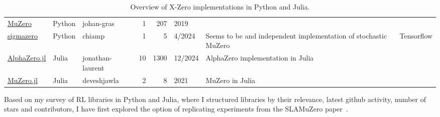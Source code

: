 \documentclass[12pt]{article}
\begin{document}
\begin{table}
\begin{adjustbox}{width=\textwidth}
\begin{tabular}{lllrrlp{6cm}l}
        \href{https://github.com/johan-gras/MuZero}{MuZero} &   Python &       johan-gras &             1 &    207 &        2019 &                                                                                                                                                                                                                                                                                             &         \\
        \href{https://github.com/chiamp/sigmazero}{sigmazero} &   Python &           chiamp &             1 &      5 &      4/2024 &                                                                                                                                                                                                                              Seems to be and independent implementation of stochastic MuZero & Tensorflow \\
        \href{https://github.com/jonathan-laurent/AlphaZero.jl}{AlphaZero.jl} &    Julia & jonathan-laurent &            10 &   1300 &     12/2024 &                                                                                                                                                                                                                                                              AlphaZero implementation in Julia &         \\
        \href{https://github.com/deveshjawla/MuZero.jl}{MuZero.jl} &    Julia &      deveshjawla &             2 &      8 &        2021 &                                                                                                                                                                                                                                                                                MuZero in Julia &         \\
        \bottomrule
    \end{tabular}
    \end{adjustbox}
    \caption{Overview of X-Zero implementations in Python and Julia.}
\end{table}
    
Based on my survey of RL libraries in Python and Julia, where I structured libraries by their relevance, latest github activity, number of stars and contributors, I have first explored the option of replicating experiments from the SLAMuZero paper~\cite{fangSLAMuZeroPlanLearn2024}. 
\end{document}
